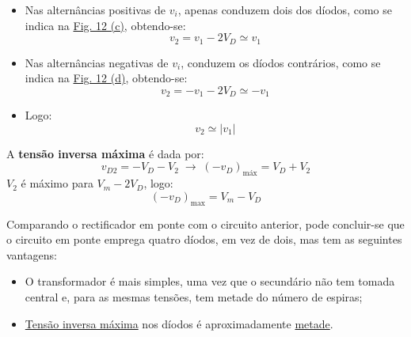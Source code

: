 \begin{itemize}
    \item Nas alternâncias positivas de $v_i$, apenas conduzem dois dos díodos, como se indica na \hyperref[fig:ponte-graetz]{Fig. 12 (c)}, obtendo-se:
    $$
        v_2 = v_1 - 2V_D \simeq v_1
    $$
    \item Nas alternâncias negativas de $v_i$, conduzem os díodos contrários, como se indica na \hyperref[fig:ponte-graetz]{Fig. 12 (d)}, obtendo-se:
    $$
        v_2 = - v_1 - 2V_D \simeq  - v_1
    $$
    \item Logo:
    $$
        v_2 \simeq |v_1|
    $$
\end{itemize}

\noindent A \textbf{tensão inversa máxima} é dada por:
$$
    v_{D2} = -V_D - V_2\; \pmb{\longrightarrow}\; (-v_D)_{\text{máx}} = V_D + V_2
$$
\noindent $V_2$ é máximo para $V_m - 2V_{D}$, logo:
$$
    \boxed{(-v_D)_{\text{max}} = V_m - V_{D}}
$$

\noindent Comparando o rectificador em ponte com o circuito anterior, pode concluir-se que o circuito em ponte emprega quatro díodos, em vez de dois, mas tem as seguintes vantagens:

\begin{itemize}
    \item  O transformador é mais simples, uma vez que o secundário não tem tomada central e, para as mesmas tensões, tem metade do número de espiras;
    \item \underline{Tensão inversa máxima} nos díodos é aproximadamente \underline{metade}.
\end{itemize}

